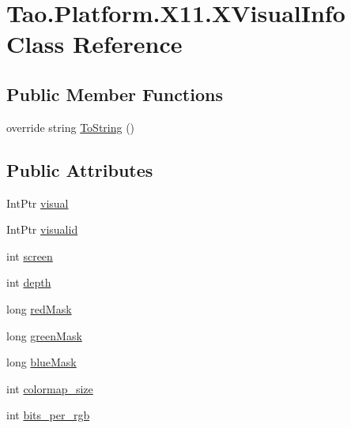 \hypertarget{class_tao_1_1_platform_1_1_x11_1_1_x_visual_info}{
\section{Tao.Platform.X11.XVisualInfo Class Reference}
\label{class_tao_1_1_platform_1_1_x11_1_1_x_visual_info}
}
\subsection*{Public Member Functions}
\begin{DoxyCompactItemize}
\item 
override string \hyperlink{class_tao_1_1_platform_1_1_x11_1_1_x_visual_info_a8abbd863e88175a65eac1aa15826498a}{ToString} ()
\end{DoxyCompactItemize}
\subsection*{Public Attributes}
\begin{DoxyCompactItemize}
\item 
IntPtr \hyperlink{class_tao_1_1_platform_1_1_x11_1_1_x_visual_info_a5f1805b02392ef6d86d67411a08c2f08}{visual}
\item 
IntPtr \hyperlink{class_tao_1_1_platform_1_1_x11_1_1_x_visual_info_a242559bbeca386fe1bdd35ac360b7519}{visualid}
\item 
int \hyperlink{class_tao_1_1_platform_1_1_x11_1_1_x_visual_info_a64f17698a8a290b1bd5a5dc9a7ac6a61}{screen}
\item 
int \hyperlink{class_tao_1_1_platform_1_1_x11_1_1_x_visual_info_a5e7abaece4de9f5a2dfb68f2ece8f0ee}{depth}
\item 
long \hyperlink{class_tao_1_1_platform_1_1_x11_1_1_x_visual_info_a6781e5ff1c8c41250230be69b39a6772}{redMask}
\item 
long \hyperlink{class_tao_1_1_platform_1_1_x11_1_1_x_visual_info_a4b31e7fcb78a2784c6deb386c948a0cc}{greenMask}
\item 
long \hyperlink{class_tao_1_1_platform_1_1_x11_1_1_x_visual_info_a15839b2aebffa8142af89b06f51ccd40}{blueMask}
\item 
int \hyperlink{class_tao_1_1_platform_1_1_x11_1_1_x_visual_info_a238734867af1d30adb97de1d321be167}{colormap\_\-size}
\item 
int \hyperlink{class_tao_1_1_platform_1_1_x11_1_1_x_visual_info_a3f39cc1a6c602e48f4597b6c090d8633}{bits\_\-per\_\-rgb}
\end{DoxyCompactItemize}


